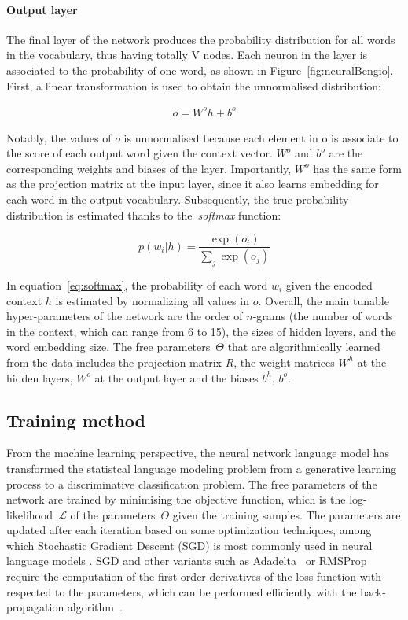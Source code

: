 \paragraph{Output layer}
The final layer of the network produces the probability distribution for all words in the vocabulary, thus having totally V nodes. Each neuron in the layer is associated to the probability of one word, as shown in Figure~\ref{fig:neuralBengio}. First, a linear transformation is used to obtain the unnormalised distribution:

\begin{equation}
\begin{aligned}
o = W^o h + b^o
\label{eq:linearoutput}
\end{aligned}  
\end{equation}

Notably, the values of $o$ is unnormalised because each element in o is associate to the score of each output word given the context vector. $W^o$ and $b^o$ are the corresponding weights and biases of the layer. Importantly, $W^o$ has the same form as the projection matrix at the input layer, since it also learns embedding for each word in the output vocabulary. Subsequently, the true probability distribution is estimated thanks to the~\textit{softmax} function:

\begin{equation}
p(w_i | h) = \frac{\exp(o_i)}{\sum_j \exp(o_j)}
\label{eq:softmax}
\end{equation}

In equation~\ref{eq:softmax}, the probability of each word $w_i$ given the encoded context $h$ is estimated by normalizing all values in $o$. Overall, the main tunable hyper-parameters of the network are the order of $n$-grams (the number of words in the context, which can range from 6 to 15), the sizes of hidden layers, and the word embedding size. The free parameters~$\Theta$ that are algorithmically learned from the data includes the projection matrix $R$, the weight matrices $W^h$ at the hidden layers, $W^o$ at the output layer and the biases $b^h$, $b^o$. 


\subsection{Training method}
From the machine learning perspective, the neural network language model has transformed the statistcal language modeling problem from a generative learning process to a discriminative classification problem. The free parameters of the network are trained by minimising the objective function, which is the log-likelihood~$\mathcal{L}$ of the  parameters~$\Theta$ given the training samples. The parameters are updated after each iteration based on some optimization techniques, among which Stochastic Gradient Descent (SGD) is most commonly used in neural language models \cite{zaremba2014recurrent,le2011structured,mikolov2010recurrent}. SGD and other variants such as Adadelta~\cite{zeiler2012adadelta} or RMSProp~\cite{tieleman2012lecture} require the computation of the first order derivatives of the loss function with respected to the parameters, which can be performed efficiently with the back-propagation algorithm~\cite{le1990handwritten}.

